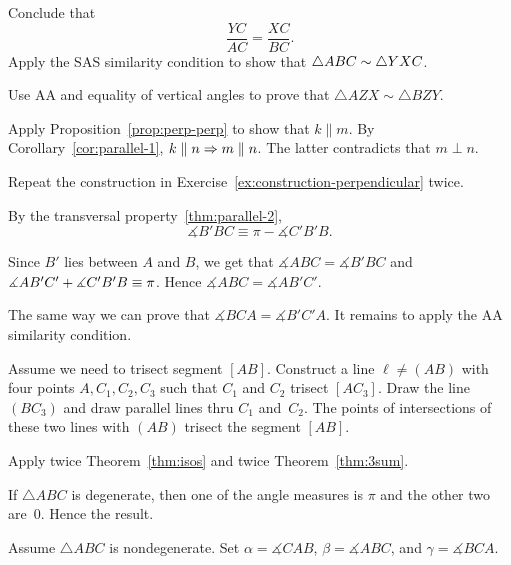 Conclude that 
\[\frac{YC}{AC}=\frac{XC}{BC}.\]
Apply the SAS similarity condition to show that $\triangle ABC\z\sim \triangle YXC$.

Use AA and equality of vertical angles to prove that $\triangle AZX\sim \triangle BZY$.


\setcounter{eqtn}{0}


Apply Proposition~\ref{prop:perp-perp} to show that $k\parallel m$.
By Corollary~\ref{cor:parallel-1}, $k\parallel n\z\Rightarrow m\parallel n$.
The latter contradicts that $m\perp n$.

Repeat the construction in Exercise~\ref{ex:construction-perpendicular} twice.


By the transversal property~\ref{thm:parallel-2},
\[\measuredangle B'BC \equiv \pi -\measuredangle C'B'B.\]

Since $B'$ lies between $A$ and $B$, we get that 
$\measuredangle ABC=\measuredangle B'BC$ and $\measuredangle AB'C'+\measuredangle C'B'B\z\equiv \pi$.
Hence $\measuredangle ABC= \measuredangle AB'C'$.

The same way we can prove that 
$\measuredangle BCA= \measuredangle B'C'A$.
It remains to apply the AA similarity condition.

Assume we need to trisect segment $[AB]$.
Construct a line $\ell\ne (AB)$ with four points $A,C_1,C_2, C_3$
such that $C_1$ and $C_2$ trisect $[AC_3]$.
Draw the line $(BC_3)$
and draw parallel lines thru $C_1$ and~$C_2$.
The points of intersections of these two lines with $(AB)$ trisect the segment $[AB]$.

Apply twice Theorem~\ref{thm:isos} and twice Theorem~\ref{thm:3sum}.


If $\triangle ABC$ is degenerate, then one of the angle measures is $\pi$ and the other two are~$0$.
Hence the result.

Assume $\triangle ABC$ is nondegenerate.
Set $\alpha=\measuredangle CAB$, $\beta=\measuredangle ABC$, and $\gamma=\measuredangle BCA$.

